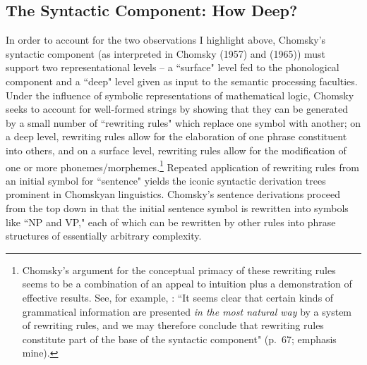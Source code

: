\subsection{The Syntactic Component: How Deep?}
In order to account for the two observations I highlight above, Chomsky's syntactic component (as interpreted in Chomsky (1957) and (1965)) must support two representational levels -- a ``surface" level fed to the phonological component and a ``deep" level given as input to the semantic processing faculties.  Under the influence of symbolic representations of mathematical logic, Chomsky seeks to account for well-formed strings by showing that they can be generated by a small number of ``rewriting rules" which replace one symbol with another; on a deep level, rewriting rules allow for the elaboration of one phrase constituent into others, and on a surface level, rewriting rules allow for the modification of one or more phonemes/morphemes.\footnote{Chomsky's argument for the conceptual primacy of these rewriting rules seems to be a combination of an appeal to intuition plus a demonstration of effective results.  See, for example, \cite{chomsky1965}: ``It seems clear that certain kinds of grammatical information are presented \emph{in the most natural way} by a system of rewriting rules, and we may therefore conclude that rewriting rules constitute part of the base of the syntactic component" (p.\ 67; emphasis mine).}  Repeated application of rewriting rules from an initial symbol for ``sentence" yields the iconic syntactic derivation trees prominent in Chomskyan linguistics.  Chomsky's sentence derivations proceed from the top down in that the initial sentence symbol is rewritten into symbols like ``NP and VP," each of which can be rewritten by other rules into phrase structures of essentially arbitrary complexity.

